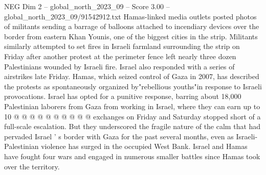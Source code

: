 \begin{textsample}{NEG Dim 2 – global\_north\_2023\_09 – Score 3.00 – global\_north\_2023\_09/91542912.txt}
Hamas-linked media outlets posted photos of militants sending a barrage of balloons attached to incendiary devices over the border from eastern Khan Younis, one of the biggest cities in the strip.
Militants similarly attempted to set fires in Israeli farmland surrounding the strip on Friday after another protest at the perimeter fence left nearly three dozen Palestinians wounded by Israeli fire.
Israel also responded with a series of airstrikes late Friday.
Hamas, which seized control of Gaza in 2007, has described the protests as spontaneously organized by"rebellious youths"in response to Israeli provocations.
Israel has opted for a punitive response, barring about 18,000 Palestinian laborers from Gaza from working in Israel, where they can earn up to 10 @ @ @ @ @ @ @ @ @ @ exchanges on Friday and Saturday stopped short of a full-scale escalation.
But they underscored the fragile nature of the calm that had pervaded Israel ' s border with Gaza for the past several months, even as Israeli-Palestinian violence has surged in the occupied West Bank.
Israel and Hamas have fought four wars and engaged in numerous smaller battles since Hamas took over the territory.

\end{textsample}
